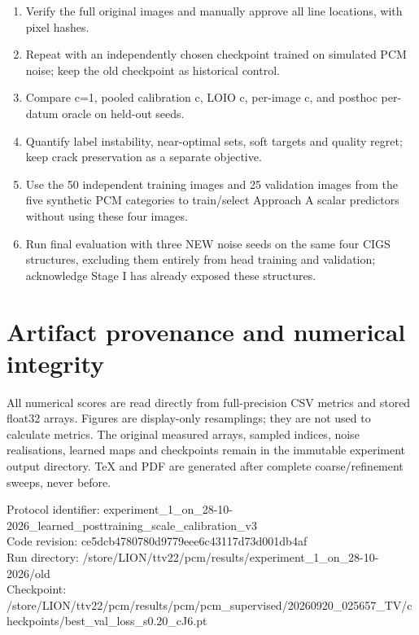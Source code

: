\documentclass[11pt,a4paper]{article}
\begin{document}
\begin{enumerate}

\item Verify the full original images and manually approve all line locations, with pixel hashes.

\item Repeat with an independently chosen checkpoint trained on simulated PCM noise; keep the old checkpoint as historical control.

\item Compare c=1, pooled calibration c, LOIO c, per-image c, and posthoc per-datum oracle on held-out seeds.

\item Quantify label instability, near-optimal sets, soft targets and quality regret; keep crack preservation as a separate objective.

\item Use the 50 independent training images and 25 validation images from the five synthetic PCM categories to train/select Approach A scalar predictors without using these four images.

\item Run final evaluation with three NEW noise seeds on the same four CIGS structures, excluding them entirely from head training and validation; acknowledge Stage I has already exposed these structures.

\end{enumerate}

\section{Artifact provenance and numerical integrity}

All numerical scores are read directly from full-precision CSV metrics and stored float32 arrays. Figures are display-only resamplings; they are not used to calculate metrics. The original measured arrays, sampled indices, noise realisations, learned maps and checkpoints remain in the immutable experiment output directory. TeX and PDF are generated after complete coarse/refinement sweeps, never before.

Protocol identifier: experiment\_1\_on\_28-10-2026\_learned\_posttraining\_scale\_calibration\_v3\\Code revision: ce5dcb4780780d9779eee6c43117d73d001db4af\\Run directory: /store/LION/ttv22/pcm/results/experiment\_1\_on\_28-10-2026/old\\Checkpoint: /store/LION/ttv22/pcm/results/pcm/pcm\_supervised/20260920\_025657\_TV/checkpoints/best\_val\_loss\_s0.20\_cJ6.pt
\end{document}
